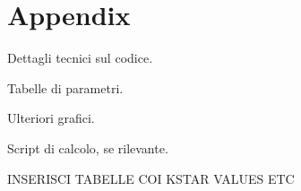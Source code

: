 \chapter{Appendix}

Dettagli tecnici sul codice.

Tabelle di parametri.

Ulteriori grafici.

Script di calcolo, se rilevante.

INSERISCI TABELLE COI KSTAR VALUES ETC




